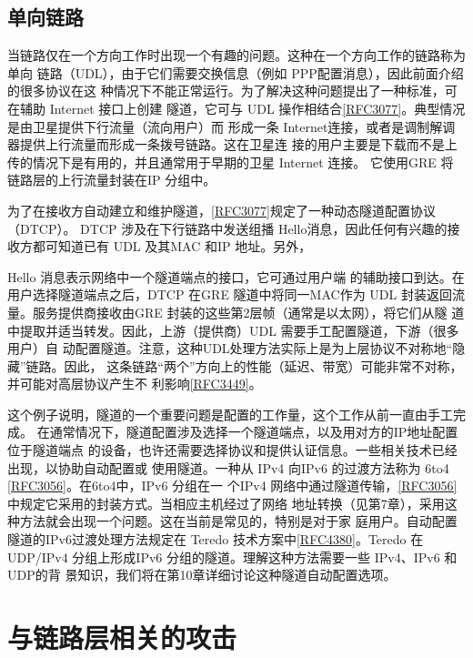 \subsection{单向链路}

当链路仅在一个方向工作时出现一个有趣的问题。这种在一个方向工作的链路称为单向
链路（UDL），由于它们需要交换信息（例如 PPP配置消息），因此前面介绍的很多协议在这
种情况下不能正常运行。为了解决这种问题提出了一种标准，可在辅助 Internet 接口上创建
隧道，它可与 UDL 操作相结合\href{https://www.rfc-editor.org/rfc/rfc3077}{[RFC3077]}。典型情况是由卫星提供下行流量（流向用户）而
形成一条 Internet连接，或者是调制解调器提供上行流量而形成一条拨号链路。这在卫星连
接的用户主要是下载而不是上传的情况下是有用的，并且通常用于早期的卫星 Internet 连接。
它使用GRE 将链路层的上行流量封装在IP 分组中。

为了在接收方自动建立和维护隧道，\href{https://www.rfc-editor.org/rfc/rfc3077}{[RFC3077]}规定了一种动态隧道配置协议（DTCP）。
DTCP 涉及在下行链路中发送组播 Hello消息，因此任何有兴趣的接收方都可知道已有 UDL
及其MAC 和IP 地址。另外，

Hello 消息表示网络中一个隧道端点的接口，它可通过用户端
的辅助接口到达。在用户选择隧道端点之后，DTCP 在GRE 隧道中将同一MAC作为 UDL
封装返回流量。服务提供商接收由GRE 封装的这些第2层帧（通常是以太网），将它们从隧
道中提取并适当转发。因此，上游（提供商）UDL 需要手工配置隧道，下游（很多用户）自
动配置隧道。注意，这种UDL处理方法实际上是为上层协议不对称地“隐藏”链路。因此，
这条链路“两个”方向上的性能（延迟、带宽）可能非常不对称，并可能对高层协议产生不
利影响\href{https://www.rfc-editor.org/rfc/rfc3449}{[RFC3449]}。

这个例子说明，隧道的一个重要问题是配置的工作量，这个工作从前一直由手工完成。
在通常情况下，隧道配置涉及选择一个隧道端点，以及用对方的IP地址配置位于隧道端点
的设备，也许还需要选择协议和提供认证信息。一些相关技术已经出现，以协助自动配置或
使用隧道。一种从 IPv4 向IPv6 的过渡方法称为 6to4 \href{https://www.rfc-editor.org/rfc/rfc3056}{[RFC3056]}。在6to4中，IPv6 分组在一
个IPv4 网络中通过隧道传输，\href{https://www.rfc-editor.org/rfc/rfc3056}{[RFC3056]}中规定它采用的封装方式。当相应主机经过了网络
地址转换（见第7章），采用这种方法就会出现一个问题。这在当前是常见的，特别是对于家
庭用户。自动配置隧道的IPv6过渡处理方法规定在 Teredo 技术方案中\href{https://www.rfc-editor.org/rfc/rfc4380}{[RFC4380]}。Teredo
在UDP/IPv4 分组上形成IPv6 分组的隧道。理解这种方法需要一些 IPv4、IPv6 和UDP的背
景知识，我们将在第10章详细讨论这种隧道自动配置选项。

\section{与链路层相关的攻击}

